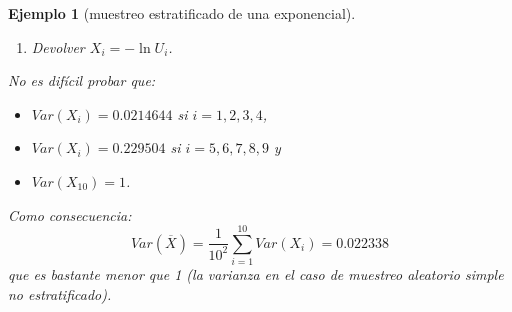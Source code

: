 \documentclass[
  spanish,
  10pt,
]{book}
\theoremstyle{break}
\newtheorem{example}{Ejemplo}[chapter]
\theoremstyle{nonumberplain}
\begin{document}
\begin{example}[muestreo estratificado de una exponencial]
\begin{enumerate}
  2a. Generar \(U\sim \mathcal{U}\left(  0,1\right)\).

  2b. Si \(i\leq4\) hacer \(U_{i} = 0.4 \cdot U + 0.6\).

  2c. Si \(4<i\leq9\) hacer \(U_{i} = 0.5 \cdot U + 0.1\).

  2d. Si \(i=10\) hacer \(U_{i} = 0.1 \cdot U\).
\item
  Devolver \(X_{i}=-\ln U_{i}\).
\end{enumerate}

No es difícil probar que:

\begin{itemize}
\item
  \(Var\left( X_{i}\right) = 0.0214644\) si \(i=1,2,3,4\),
\item
  \(Var\left( X_{i}\right) = 0.229504\) si \(i=5,6,7,8,9\) y
\item
  \(Var\left( X_{10}\right) = 1\).
\end{itemize}

Como consecuencia:
\[Var\left(  \overline{X}\right)  =\frac{1}{10^{2}}\sum_{i=1}^{10}
Var\left( X_{i} \right)  = 0.022338\]
que es bastante menor que 1 (la varianza en el caso de muestreo aleatorio simple no estratificado).
\end{example}
\end{document}
